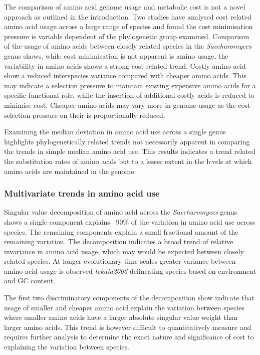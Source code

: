 The comparison of amino acid genome usage and metabolic cost is not a novel approach as outlined in the introduction. Two studies have analysed cost related amino acid usage across a large range of species \cite{seligmann2003,swire2007} and found the cost minimisation pressure is variable dependent of the phylogenetic group examined. Comparison of the usage of amino acids between closely related species in the \emph{Saccharomyces} genus shows, while cost minimisation is not apparent is amino usage, the variability in amino acids shows a strong cost related trend. Costly amino acid show a reduced interspecies variance compared with cheaper amino acids. This may indicate a selection pressure to maintain existing expensive amino acids for a specific functional role, while the insertion of additional costly acids is reduced to minimise cost. Cheaper amino acids may vary more in genome usage as the cost selection pressure on their is proportionally reduced.

Examining the median deviation in amino acid use across a single genus highlights phylogenetically related trends not necessarily apparent in comparing the trends in simple median amino acid use. This results indicates a trend related the substitution rates of amino acids but to a lesser extent in the levels at which amino acids are maintained in the genome.

\subsubsection{Multivariate trends in amino acid use}

Singular value decomposition of amino acid across the \emph{Saccharomyces} genus shows a single component explains ~90\% of the variation in amino acid use across species. The remaining components explain a small fractional amount of the remaining variation. The decomposition indicates a broad trend of relative invariance in amino acid usage, which may would be expected between closely related species. At longer evolutionary time scales greater variance between amino acid usage is observed \emph{tekaia2006} delineating species based on environment and GC content.

The first two discriminatory components of the decomposition show indicate that usage of smaller and cheaper amino acid explain the variation between species where smaller amino acids have a larger absolute singular value weight than larger amino acids. This trend is however difficult to quantitatively measure and requires further analysis to determine the exact nature and significance of cost to explaining the variation between species.

